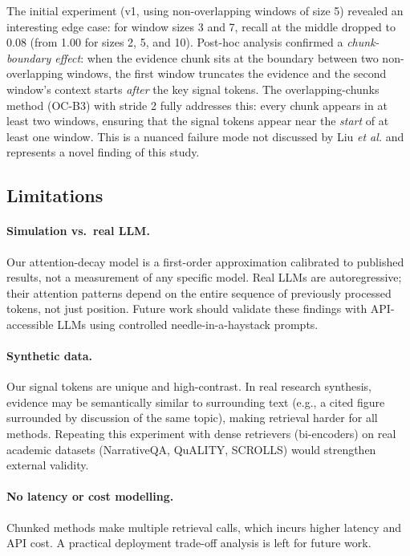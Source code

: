 \documentclass[sigconf,nonacm]{acmart}
\begin{document}
The initial experiment (v1, using non-overlapping windows of size 5) revealed
an interesting edge case: for window sizes 3 and 7, recall at the middle dropped
to 0.08 (from 1.00 for sizes 2, 5, and 10).
Post-hoc analysis confirmed a \emph{chunk-boundary effect}: when the evidence
chunk sits at the boundary between two non-overlapping windows, the first window
truncates the evidence and the second window's context starts \emph{after} the
key signal tokens.
The overlapping-chunks method (OC-B3) with stride 2 fully addresses this:
every chunk appears in at least two windows, ensuring that the signal tokens
appear near the \emph{start} of at least one window.
This is a nuanced failure mode not discussed by Liu \emph{et al.} and
represents a novel finding of this study.

\subsection{Limitations}

\paragraph{Simulation vs.\ real LLM.}
Our attention-decay model is a first-order approximation calibrated to published
results, not a measurement of any specific model.
Real LLMs are autoregressive; their attention patterns depend on the entire
sequence of previously processed tokens, not just position.
Future work should validate these findings with API-accessible LLMs using
controlled needle-in-a-haystack prompts.

\paragraph{Synthetic data.}
Our signal tokens are unique and high-contrast.
In real research synthesis, evidence may be semantically similar to surrounding
text (e.g., a cited figure surrounded by discussion of the same topic), making
retrieval harder for all methods.
Repeating this experiment with dense retrievers (bi-encoders) on real academic
datasets (NarrativeQA, QuALITY, SCROLLS) would strengthen external validity.

\paragraph{No latency or cost modelling.}
Chunked methods make multiple retrieval calls, which incurs higher latency and
API cost.
A practical deployment trade-off analysis is left for future work.
\end{document}
